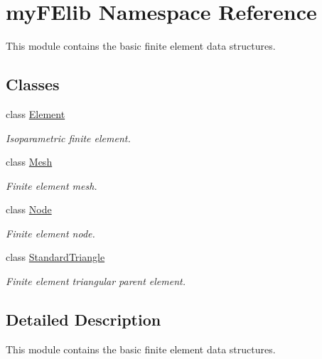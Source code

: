 \hypertarget{namespacemyFElib}{}\section{my\+F\+Elib Namespace Reference}
\label{namespacemyFElib}


This module contains the basic finite element data structures.  


\subsection*{Classes}
\begin{DoxyCompactItemize}
\item 
class \mbox{\hyperlink{classmyFElib_1_1Element}{Element}}
\begin{DoxyCompactList}\small\item\em Isoparametric finite element. \end{DoxyCompactList}\item 
class \mbox{\hyperlink{classmyFElib_1_1Mesh}{Mesh}}
\begin{DoxyCompactList}\small\item\em Finite element mesh. \end{DoxyCompactList}\item 
class \mbox{\hyperlink{classmyFElib_1_1Node}{Node}}
\begin{DoxyCompactList}\small\item\em Finite element node. \end{DoxyCompactList}\item 
class \mbox{\hyperlink{classmyFElib_1_1StandardTriangle}{Standard\+Triangle}}
\begin{DoxyCompactList}\small\item\em Finite element triangular parent element. \end{DoxyCompactList}\end{DoxyCompactItemize}


\subsection{Detailed Description}
This module contains the basic finite element data structures. 